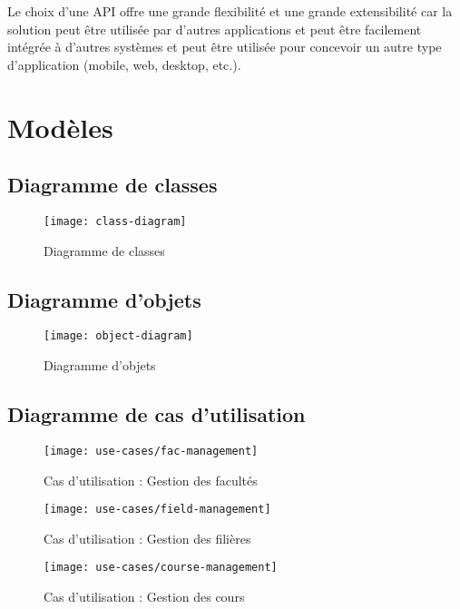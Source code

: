 Le choix d'une API offre une grande flexibilité et une grande extensibilité
car la solution peut être utilisée par d'autres applications et peut être
facilement intégrée à d'autres systèmes et peut être utilisée pour concevoir
un autre type d'application (mobile, web, desktop, etc.).

\section{Modèles}\label{sec: conception-database-models}
\subsection{Diagramme de classes}\label{subsec:conception-class-diagram}
\begin{figure}[ht]
    \centering
    \caption{Diagramme de classes}
    \texttt{[image: class-diagram]}
    \label{fig:class-diagram}
\end{figure}
\pagebreak

\subsection{Diagramme d'objets}\label{subsec:conception-object-diagram}
\begin{figure}[ht]
    \centering
    \caption{Diagramme d'objets}
    \texttt{[image: object-diagram]}
    \label{fig:object-diagram}
\end{figure}
\pagebreak


\subsection{Diagramme de cas d'utilisation}\label{subsec:conception-use-case-diagram}
\begin{figure}[ht]
    \caption{Cas d'utilisation : Gestion des facultés}
    \texttt{[image: use-cases/fac-management]}
    \centering
    \label{fig:fac-management}
\end{figure}
\pagebreak

\begin{figure}[ht]
    \caption{Cas d'utilisation : Gestion des filières}
    \texttt{[image: use-cases/field-management]}
    \centering
    \label{fig:field-management}
\end{figure}
\pagebreak

\begin{figure}[ht]
    \caption{Cas d'utilisation : Gestion des cours}
    \texttt{[image: use-cases/course-management]}
    \centering
    \label{fig:course-management}
\end{figure}
\pagebreak

